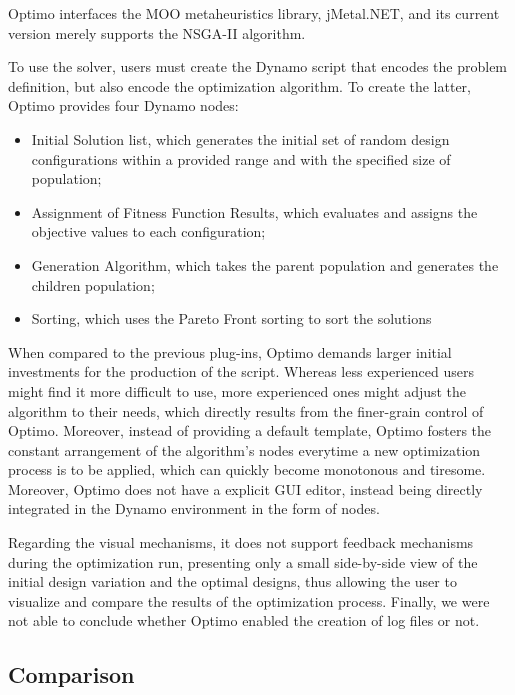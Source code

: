 	Optimo interfaces the \ac{MOO} metaheuristics library, jMetal.NET, and its current version merely supports the \ac{NSGA-II} algorithm\cite{Deb2002}.
	
	To use the solver, users must create the Dynamo script that encodes the problem definition, but also encode the optimization algorithm. To create the latter, Optimo provides four Dynamo nodes:
	\begin{itemize}
		\item Initial Solution list, which generates the initial set of random design configurations within a provided range and with the specified size of population;
		\item Assignment of Fitness Function Results, which evaluates and assigns the objective values to each configuration; 
		\item Generation Algorithm, which takes the parent population and generates the children population;
		\item Sorting, which uses the Pareto Front sorting to sort the solutions
	\end{itemize} 
	
	When compared to the previous plug-ins, Optimo demands larger initial investments for the production of the script. Whereas less experienced users might find it more difficult to use, more experienced ones might adjust the algorithm to their needs, which directly results from the finer-grain control of Optimo. Moreover, instead of providing a default template, Optimo fosters the constant arrangement of the algorithm's nodes everytime a new optimization process is to be applied, which can quickly become monotonous and tiresome. Moreover, Optimo does not have a explicit \ac{GUI} editor, instead being directly integrated in the Dynamo environment in the form of nodes.
	
	Regarding the visual mechanisms, it does not support feedback mechanisms during the optimization run, presenting only a small side-by-side view of the initial design variation and the optimal designs, thus allowing the user to visualize and compare the results of the optimization process. Finally, we were not able to conclude whether Optimo enabled the creation of log files or not. 
	
	
	\subsection{Comparison}
	
